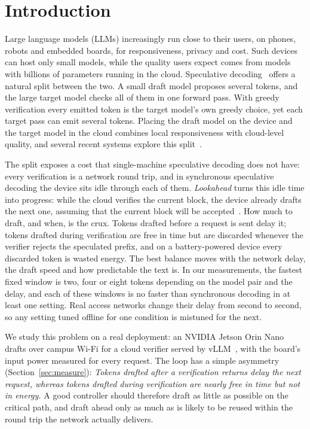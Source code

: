 \section{Introduction}
\label{sec:intro}

Large language models (LLMs) increasingly run close to their users, on phones, robots and embedded boards, for responsiveness, privacy and cost. Such devices can host only small models, while the quality users expect comes from models with billions of parameters running in the cloud. Speculative decoding~\cite{leviathan2023,chen2023} offers a natural split between the two. A small draft model proposes several tokens, and the large target model checks all of them in one forward pass. With greedy verification every emitted token is the target model's own greedy choice, yet each target pass can emit several tokens. Placing the draft model on the device and the target model in the cloud combines local responsiveness with cloud-level quality, and several recent systems explore this split~\cite{sled2025,specedge2025,dsd2025,picospec2026,pipesd2026,wisp2026}.

The split exposes a cost that single-machine speculative decoding does not have: every verification is a network round trip, and in synchronous speculative decoding the device sits idle through each of them. \emph{Lookahead} turns this idle time into progress: while the cloud verifies the current block, the device already drafts the next one, assuming that the current block will be accepted~\cite{pearl2025,picospec2026,pipesd2026}. How much to draft, and when, is the crux. Tokens drafted before a request is sent delay it; tokens drafted during verification are free in time but are discarded whenever the verifier rejects the speculated prefix, and on a battery-powered device every discarded token is wasted energy. The best balance moves with the network delay, the draft speed and how predictable the text is. In our measurements, the fastest fixed window is two, four or eight tokens depending on the model pair and the delay, and each of these windows is no faster than synchronous decoding in at least one setting. Real access networks change their delay from second to second, so any setting tuned offline for one condition is mistuned for the next.

We study this problem on a real deployment: an NVIDIA Jetson Orin Nano drafts over campus Wi-Fi for a cloud verifier served by vLLM~\cite{vllm2023}, with the board's input power measured for every request. The loop has a simple asymmetry (Section~\ref{sec:measure}):
\emph{Tokens drafted after a verification returns delay the next request, whereas tokens drafted during verification are nearly free in time but not in energy.} A good controller should therefore draft as little as possible on the critical path, and draft ahead only as much as is likely to be reused within the round trip the network actually delivers.

